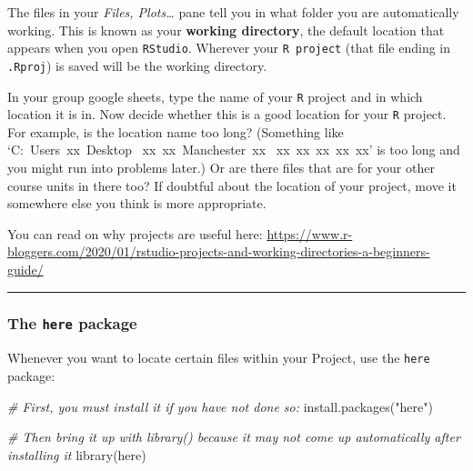 \documentclass[
]{book}
\newenvironment{Shaded}{\begin{snugshade}}{\end{snugshade}}
\newcommand{\CommentTok}[1]{\textcolor[rgb]{0.56,0.35,0.01}{\textit{#1}}}
\newcommand{\FunctionTok}[1]{\textcolor[rgb]{0.00,0.00,0.00}{#1}}
\newcommand{\NormalTok}[1]{#1}
\newcommand{\StringTok}[1]{\textcolor[rgb]{0.31,0.60,0.02}{#1}}
\begin{document}
The files in your \emph{Files, Plots\ldots{}} pane tell you in what folder you are automatically working. This is known as your \textbf{working directory}, the default location that appears when you open \texttt{RStudio}. Wherever your \texttt{R\ project} (that file ending in \texttt{.Rproj}) is saved will be the working directory.

In your group google sheets, type the name of your \texttt{R} project and in which location it is in. Now decide whether this is a good location for your \texttt{R} project. For example, is the location name too long? (Something like `C:~Users~xx~Desktop ~xx~xx~Manchester~xx ~xx~xx~xx~xx~xx' is too long and you might run into problems later.) Or are there files that are for your other course units in there too? If doubtful about the location of your project, move it somewhere else you think is more appropriate.

You can read on why projects are useful here: \url{https://www.r-bloggers.com/2020/01/rstudio-projects-and-working-directories-a-beginners-guide/}

\begin{center}\rule{0.5\linewidth}{0.5pt}\end{center}

\hypertarget{the-here-package}{%
\subsubsection{\texorpdfstring{The \texttt{here} package}{The here package}}\label{the-here-package}}

Whenever you want to locate certain files within your Project, use the \texttt{here} package:

\begin{Shaded}
\begin{Highlighting}[]
\CommentTok{\# First, you must install it if you have not done so:}
\FunctionTok{install.packages}\NormalTok{(}\StringTok{"here"}\NormalTok{)}
\end{Highlighting}
\end{Shaded}

\begin{Shaded}
\begin{Highlighting}[]
\CommentTok{\# Then bring it up with \textquotesingle{}library()\textquotesingle{} because it may not come up automatically after installing it}
\FunctionTok{library}\NormalTok{(here)}
\end{Highlighting}
\end{Shaded}
\end{document}
